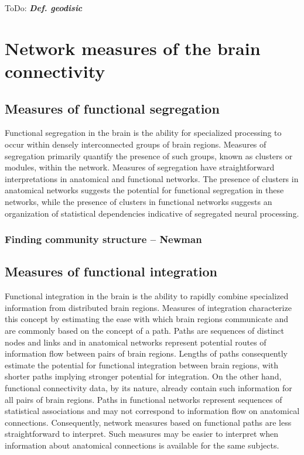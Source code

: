 \documentclass[final, paper=letter,5p,times,twocolumn]{elsarticle}
\newcommand{\ToDo}[1]{ToDo: \textbf{\textit{#1}}}
\begin{document}
\ToDo{Def. geodisic} \\

\section{Network measures of the brain connectivity}
\subsection{Measures of functional segregation}

Functional segregation in the brain is the ability for specialized processing to occur within densely interconnected groups of brain regions. Measures of segregation primarily quantify the presence of such groups, known as clusters or modules, within the network. Measures of segregation have straightforward interpretations in anatomical and functional networks. The presence of clusters in anatomical networks suggests the potential for functional segregation in these networks, while the presence of clusters in functional networks suggests an organization of statistical dependencies indicative of segregated neural processing.

\subsubsection{Finding community structure -- Newman}

\subsection{Measures of functional integration}

Functional integration in the brain is the ability to rapidly combine specialized information from distributed brain regions. Measures of integration characterize this concept by estimating the ease with which brain regions communicate and are commonly based on the concept of a path. Paths are sequences of distinct nodes and links and in anatomical networks represent potential routes of information flow between pairs of brain regions. Lengths of paths consequently estimate the potential for functional integration between brain regions, with shorter paths implying stronger potential for integration. On the other hand, functional connectivity data, by its nature, already contain such information for all pairs of brain regions. Paths in functional networks represent sequences of statistical associations and may not correspond to information flow on anatomical connections. Consequently, network measures based on functional paths are less straightforward to interpret. Such measures may be easier to interpret when information about anatomical connections is available for the same subjects.
\end{document}
